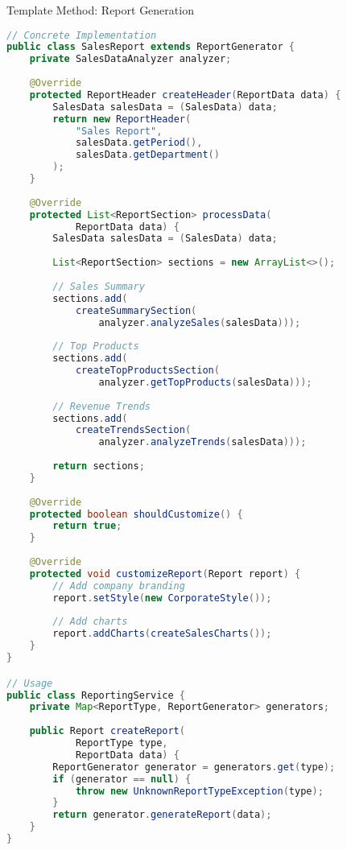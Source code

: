 \begin{example2}[breakable]{Template Method: Report Generation}
\begin{lstlisting}[language=Java, style=basesmol]
// Concrete Implementation
public class SalesReport extends ReportGenerator {
    private SalesDataAnalyzer analyzer;
    
    @Override
    protected ReportHeader createHeader(ReportData data) {
        SalesData salesData = (SalesData) data;
        return new ReportHeader(
            "Sales Report",
            salesData.getPeriod(),
            salesData.getDepartment()
        );
    }
    
    @Override
    protected List<ReportSection> processData(
            ReportData data) {
        SalesData salesData = (SalesData) data;
        
        List<ReportSection> sections = new ArrayList<>();
        
        // Sales Summary
        sections.add(
            createSummarySection(
                analyzer.analyzeSales(salesData)));
                
        // Top Products
        sections.add(
            createTopProductsSection(
                analyzer.getTopProducts(salesData)));
                
        // Revenue Trends
        sections.add(
            createTrendsSection(
                analyzer.analyzeTrends(salesData)));
                
        return sections;
    }
    
    @Override
    protected boolean shouldCustomize() {
        return true;
    }
    
    @Override
    protected void customizeReport(Report report) {
        // Add company branding
        report.setStyle(new CorporateStyle());
        
        // Add charts
        report.addCharts(createSalesCharts());
    }
}

// Usage
public class ReportingService {
    private Map<ReportType, ReportGenerator> generators;
    
    public Report createReport(
            ReportType type, 
            ReportData data) {
        ReportGenerator generator = generators.get(type);
        if (generator == null) {
            throw new UnknownReportTypeException(type);
        }
        return generator.generateReport(data);
    }
}
\end{lstlisting}
\end{example2}

